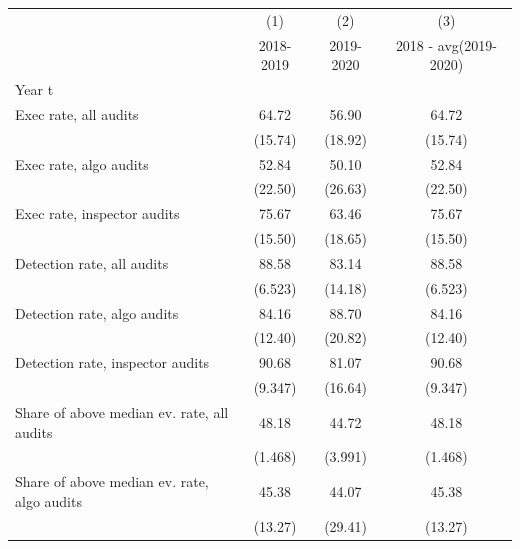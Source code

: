 {
\def\sym#1{\ifmmode^{#1}\else\(^{#1}\)\fi}
\begin{tabular}{l*{3}{c}}
\toprule
            &\multicolumn{1}{c}{(1)}&\multicolumn{1}{c}{(2)}&\multicolumn{1}{c}{(3)}\\
            &\multicolumn{1}{c}{2018-2019}&\multicolumn{1}{c}{2019-2020}&\multicolumn{1}{c}{2018 - avg(2019-2020)}\\
\midrule
Year t      &                     &                     &                     \\
Exec rate, all audits&       64.72         &       56.90         &       64.72         \\
            &     (15.74)         &     (18.92)         &     (15.74)         \\
Exec rate, algo audits&       52.84         &       50.10         &       52.84         \\
            &     (22.50)         &     (26.63)         &     (22.50)         \\
Exec rate, inspector audits&       75.67         &       63.46         &       75.67         \\
            &     (15.50)         &     (18.65)         &     (15.50)         \\
Detection rate, all audits&       88.58         &       83.14         &       88.58         \\
            &     (6.523)         &     (14.18)         &     (6.523)         \\
Detection rate, algo audits&       84.16         &       88.70         &       84.16         \\
            &     (12.40)         &     (20.82)         &     (12.40)         \\
Detection rate, inspector audits&       90.68         &       81.07         &       90.68         \\
            &     (9.347)         &     (16.64)         &     (9.347)         \\
Share of above median ev. rate, all audits&       48.18         &       44.72         &       48.18         \\
            &     (1.468)         &     (3.991)         &     (1.468)         \\
Share of above median ev. rate, algo audits&       45.38         &       44.07         &       45.38         \\
            &     (13.27)         &     (29.41)         &     (13.27)         \\

\end{tabular}}
